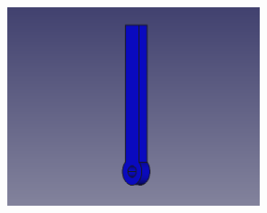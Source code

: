 \documentclass{beamer}
\begin{document}
\begin{frame}
\begin{columns}
\begin{column}{0.5\textwidth}
			\includegraphics[width=0.55\textwidth]{figs/trasera2.png} \\[10pt]
		\end{column}
	\end{columns}
\end{frame}
\end{document}
